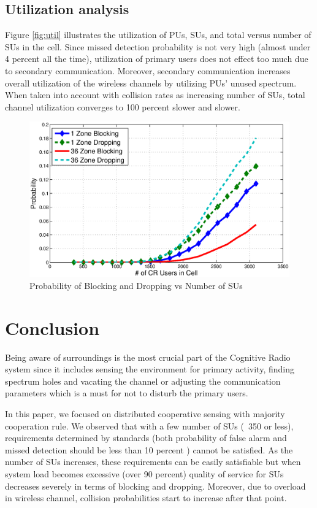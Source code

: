 \documentclass[conference,compsoc]{IEEEtran}
\newcommand{\CR}{Cognitive Radio }
\begin{document}
\subsection{Utilization analysis}
Figure \ref{fig:util} illustrates the utilization of PUs, SUs, and total versus number of SUs in the cell. Since missed detection probability is not very high (almost under 4 percent all the time), utilization of primary users does not effect too much due to secondary communication. Moreover, secondary communication increases overall utilization of the wireless channels by utilizing PUs' unused spectrum. When taken into account with collision rates as increasing number of SUs, total channel utilization converges to 100 percent slower and slower.

\begin{figure}[t]
\centering
\includegraphics[width=0.99\columnwidth,keepaspectratio] {figs/pb_d.eps}
\caption{Probability of Blocking and Dropping vs Number of SUs}
\label{fig:probb}
\end{figure}

\section{\label{sec:conclusion}Conclusion}
Being aware of surroundings is the most crucial part of the \CR system since it includes sensing the environment for primary activity, finding spectrum holes and vacating the channel or adjusting the communication parameters which is a must for not to disturb the primary users.

In this paper, we focused on distributed cooperative sensing with majority cooperation rule. We observed that with a few number of SUs (~350 or less), requirements determined by standards (both probability of false alarm and missed detection should be less than 10 percent \cite{wranstandard}) cannot be satisfied. As the number of SUs increases, these requirements can be easily satisfiable but when system load becomes excessive (over 90 percent) quality of service for SUs decreases severely in terms of blocking and dropping. Moreover, due to overload in wireless channel, collision probabilities start to increase after that point.
\end{document}
